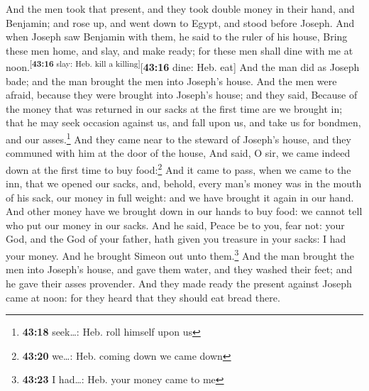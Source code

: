 And the men took that present, and they took double
money in their hand, and Benjamin; and rose up, and went down to Egypt,
and stood before Joseph.  And when Joseph saw Benjamin
with them, he said to the ruler of his house, Bring these men home, and
slay, and make ready; for these men shall dine with me at
noon.\textsuperscript{{[}\textbf{43:16} slay: Heb. kill a
killing{]}}{[}\textbf{43:16} dine: Heb. eat{]}  And the
man did as Joseph bade; and the man brought the men into Joseph's house.
 And the men were afraid, because they were brought into
Joseph's house; and they said, Because of the money that was returned in
our sacks at the first time are we brought in; that he may seek occasion
against us, and fall upon us, and take us for bondmen, and our
asses.\footnote{\textbf{43:18} seek\ldots: Heb. roll himself upon us}
 And they came near to the steward of Joseph's house, and
they communed with him at the door of the house,  And
said, O sir, we came indeed down at the first time to buy
food:\footnote{\textbf{43:20} we\ldots: Heb. coming down we came down}
 And it came to pass, when we came to the inn, that we
opened our sacks, and, behold, every man's money was in the mouth of his
sack, our money in full weight: and we have brought it again in our
hand.  And other money have we brought down in our hands
to buy food: we cannot tell who put our money in our sacks.
 And he said, Peace be to you, fear not: your God, and
the God of your father, hath given you treasure in your sacks: I had
your money. And he brought Simeon out unto them.\footnote{\textbf{43:23}
  I had\ldots: Heb. your money came to me}  And the man
brought the men into Joseph's house, and gave them water, and they
washed their feet; and he gave their asses provender. 
And they made ready the present against Joseph came at noon: for they
heard that they should eat bread there.

